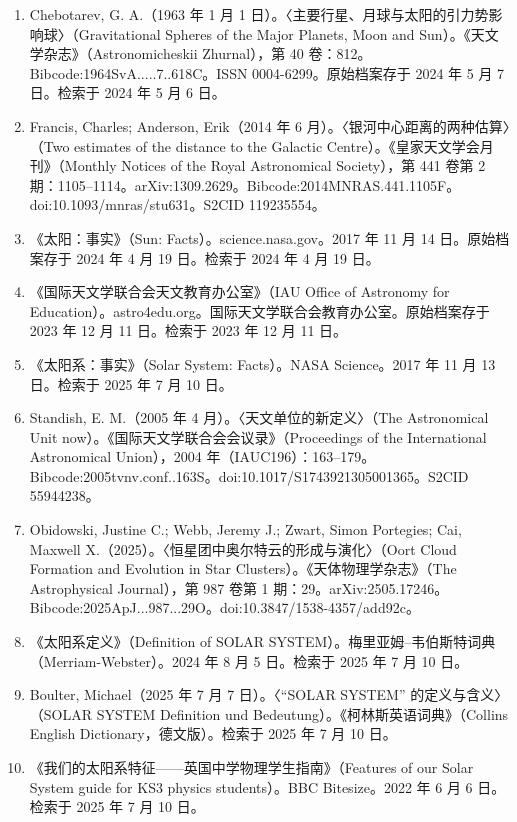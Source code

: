 \begin{enumerate}
\item Chebotarev, G. A.（1963 年 1 月 1 日）。〈主要行星、月球与太阳的引力势影响球〉（Gravitational Spheres of the Major Planets, Moon and Sun）。《天文学杂志》（Astronomicheskii Zhurnal），第 40 卷：812。Bibcode:1964SvA.....7..618C。ISSN 0004-6299。原始档案存于 2024 年 5 月 7 日。检索于 2024 年 5 月 6 日。
\item Francis, Charles; Anderson, Erik（2014 年 6 月）。〈银河中心距离的两种估算〉（Two estimates of the distance to the Galactic Centre）。《皇家天文学会月刊》（Monthly Notices of the Royal Astronomical Society），第 441 卷第 2 期：1105–1114。arXiv:1309.2629。Bibcode:2014MNRAS.441.1105F。doi:10.1093/mnras/stu631。S2CID 119235554。
\item 《太阳：事实》（Sun: Facts）。science.nasa.gov。2017 年 11 月 14 日。原始档案存于 2024 年 4 月 19 日。检索于 2024 年 4 月 19 日。
\item 《国际天文学联合会天文教育办公室》（IAU Office of Astronomy for Education）。astro4edu.org。国际天文学联合会教育办公室。原始档案存于 2023 年 12 月 11 日。检索于 2023 年 12 月 11 日。
\item 《太阳系：事实》（Solar System: Facts）。NASA Science。2017 年 11 月 13 日。检索于 2025 年 7 月 10 日。
\item Standish, E. M.（2005 年 4 月）。〈天文单位的新定义〉（The Astronomical Unit now）。《国际天文学联合会会议录》（Proceedings of the International Astronomical Union），2004 年（IAUC196）：163–179。Bibcode:2005tvnv.conf..163S。doi:10.1017/S1743921305001365。S2CID 55944238。
\item Obidowski, Justine C.; Webb, Jeremy J.; Zwart, Simon Portegies; Cai, Maxwell X.（2025）。〈恒星团中奥尔特云的形成与演化〉（Oort Cloud Formation and Evolution in Star Clusters）。《天体物理学杂志》（The Astrophysical Journal），第 987 卷第 1 期：29。arXiv:2505.17246。Bibcode:2025ApJ...987...29O。doi:10.3847/1538-4357/add92c。
\item 《太阳系定义》（Definition of SOLAR SYSTEM）。梅里亚姆–韦伯斯特词典（Merriam-Webster）。2024 年 8 月 5 日。检索于 2025 年 7 月 10 日。
\item Boulter, Michael（2025 年 7 月 7 日）。〈“SOLAR SYSTEM” 的定义与含义〉（SOLAR SYSTEM Definition und Bedeutung）。《柯林斯英语词典》（Collins English Dictionary，德文版）。检索于 2025 年 7 月 10 日。
\item 《我们的太阳系特征——英国中学物理学生指南》（Features of our Solar System guide for KS3 physics students）。BBC Bitesize。2022 年 6 月 6 日。检索于 2025 年 7 月 10 日。

\end{enumerate}
